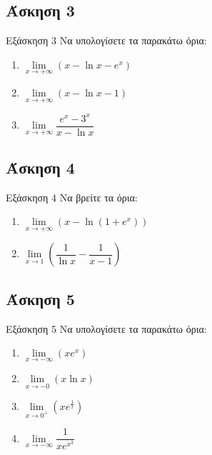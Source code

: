 \documentclass[greek]{beamer}
\begin{document}
\subsection{Άσκηση 3}
\begin{frame}[label=Άσκηση3,t]{Εξάσκηση 3}
    Να υπολογίσετε τα παρακάτω όρια:
    \begin{enumerate}
        \item<1-> $\lim\limits_{x \to +\infty}{ (x-\ln x-e^x) }$
        \item<2-> $\lim\limits_{x \to +\infty}{ (x-\ln x-1) }$
        \item<3-> $\lim\limits_{x \to +\infty}{ \dfrac{e^x-3^x}{x-\ln x} }$
    \end{enumerate}

\end{frame}

\subsection{Άσκηση 4}
\begin{frame}[label=Άσκηση4,t]{Εξάσκηση 4}
    Να βρείτε τα όρια:
    \begin{enumerate}
        \item<1-> $\lim\limits_{x \to +\infty}{ (x-\ln (1+e^x)) }$
        \item<2-> $\lim\limits_{x \to 1}{ \left( \dfrac{1}{\ln x} - \dfrac{1}{x-1} \right)  }$
    \end{enumerate}

\end{frame}

\subsection{Άσκηση 5}
\begin{frame}[label=Άσκηση5,t]{Εξάσκηση 5}
    Να υπολογίσετε τα παρακάτω όρια:
    \begin{enumerate}
        \item<1-> $\lim\limits_{x \to -\infty}{ (xe^x) }$
        \item<2-> $\lim\limits_{x \to -0}{ (x\ln x) }$
        \item<3-> $\lim\limits_{x \to 0^+}{ \left( xe^{\frac{1}{x}} \right)  }$
        \item<4-> $\lim\limits_{x \to -\infty}{ \dfrac{1}{xe^{x^3}} }$
    \end{enumerate}

\end{frame}
\end{document}
